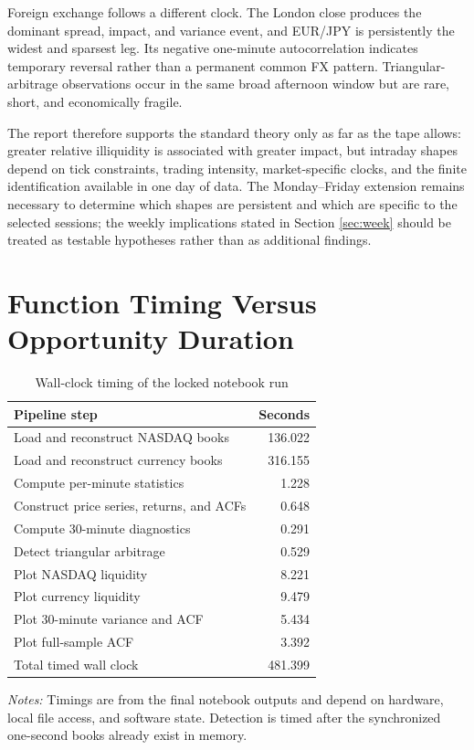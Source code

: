 \documentclass[11pt]{article}
\begin{document}
Foreign exchange follows a different clock. The London close produces the dominant spread, impact, and variance event, and EUR/JPY is persistently the widest and sparsest leg. Its negative one-minute autocorrelation indicates temporary reversal rather than a permanent common FX pattern. Triangular-arbitrage observations occur in the same broad afternoon window but are rare, short, and economically fragile.

The report therefore supports the standard theory only as far as the tape allows: greater relative illiquidity is associated with greater impact, but intraday shapes depend on tick constraints, trading intensity, market-specific clocks, and the finite identification available in one day of data. The Monday--Friday extension remains necessary to determine which shapes are persistent and which are specific to the selected sessions; the weekly implications stated in Section \ref{sec:week} should be treated as testable hypotheses rather than as additional findings.

\appendix
\section{Function Timing Versus Opportunity Duration}

\begin{table}[H]
\centering
\caption{Wall-clock timing of the locked notebook run}
\label{tab:timing}
\small
\begin{threeparttable}
\begin{tabular}{@{}lr@{}}
\toprule
Pipeline step & Seconds\\
\midrule
Load and reconstruct NASDAQ books & 136.022\\
Load and reconstruct currency books & 316.155\\
Compute per-minute statistics & 1.228\\
Construct price series, returns, and ACFs & 0.648\\
Compute 30-minute diagnostics & 0.291\\
Detect triangular arbitrage & 0.529\\
Plot NASDAQ liquidity & 8.221\\
Plot currency liquidity & 9.479\\
Plot 30-minute variance and ACF & 5.434\\
Plot full-sample ACF & 3.392\\
\midrule
Total timed wall clock & 481.399\\
\bottomrule
\end{tabular}
\begin{tablenotes}[flushleft]\footnotesize
\item \textit{Notes:} Timings are from the final notebook outputs and depend on hardware, local file access, and software state. Detection is timed after the synchronized one-second books already exist in memory.
\end{tablenotes}
\end{threeparttable}
\end{table}
\end{document}
